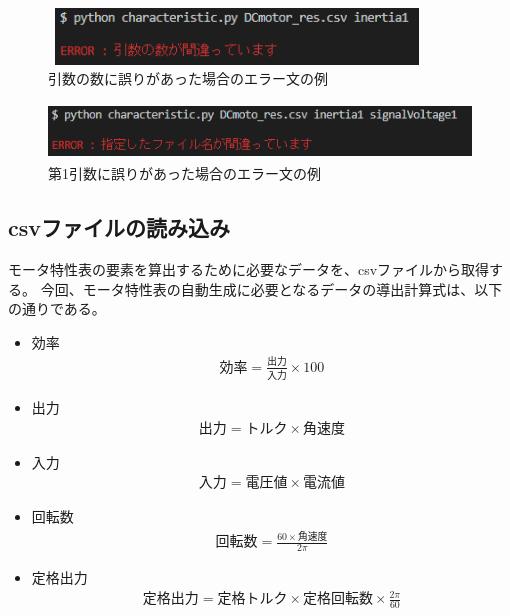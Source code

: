 \begin{figure}[t]
	\centering
	\includegraphics[width=10cm,height=1.5cm]{./Image/error_tarinai.png}
	\caption{引数の数に誤りがあった場合のエラー文の例}
	\label{fig:error_hikisuu}
\end{figure}
\begin{figure}[t]
	\centering
	\includegraphics[width=12cm,height=1.5cm]{./Image/error_file.png}
	\caption{第1引数に誤りがあった場合のエラー文の例}
	\label{fig:error_file}
\end{figure}
\subsection{csvファイルの読み込み}\label{sub:csv_scan}
モータ特性表の要素を算出するために必要なデータを、csvファイルから取得する。
今回、モータ特性表の自動生成に必要となるデータの導出計算式は、以下の通りである。
\begin{itemize}
    \item 効率
    \begin{eqnarray}
         \mbox{効率} = \frac{\mbox{出力}}{\mbox{入力}}  \times 100 
        \end{eqnarray}

        \item 出力 
        \begin{eqnarray}
        \mbox{出力} = \mbox{トルク} \times \mbox{角速度} 
         \end{eqnarray}
         
        \item 入力  \begin{eqnarray} \mbox{入力} = \mbox{電圧値} \times \mbox{電流値} 
    \end{eqnarray}
        \item 回転数  \begin{eqnarray} \mbox{回転数} = \frac{60 \times \mbox{角速度}}{2\pi}   
    \end{eqnarray}
        \item 定格出力  \begin{eqnarray} \mbox{定格出力} = \mbox{定格トルク} \times \mbox{定格回転数} \times \frac{2\pi}{60}　
     \end{eqnarray}
     
\end{itemize}


